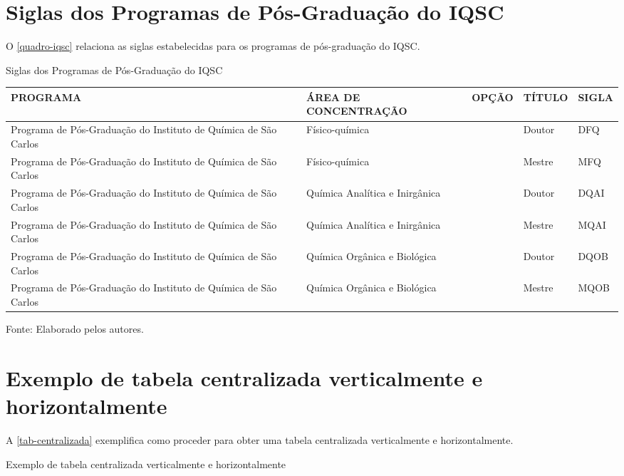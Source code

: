 \begin{apendicesenv}
\chapter{Siglas dos Programas de Pós-Graduação do IQSC}
O \autoref{quadro-iqsc} relaciona as siglas estabelecidas para os programas de pós-graduação do IQSC.
\begin{quadro}[htb]
\ABNTEXfontereduzida
\caption[Siglas dos Programas de Pós-Graduação do IQSC]{Siglas dos Programas de Pós-Graduação do IQSC}
\label{quadro-iqsc}
\begin{tabular}{|p{3.5cm}|p{3.5cm}|p{3.5cm}|p{1.5cm}|p{2.25cm}|}
  \hline
   \textbf{PROGRAMA} & \textbf{ÁREA DE CONCENTRAÇÃO} & \textbf{OPÇÃO} & \textbf{TÍTULO} & \textbf{SIGLA}  \\
    \hline
Programa de Pós-Graduação do Instituto de Química de São Carlos & Físico-química &  & Doutor & DFQ\\
Programa de Pós-Graduação do Instituto de Química de São Carlos & Físico-química &  & Mestre & MFQ\\
Programa de Pós-Graduação do Instituto de Química de São Carlos & Química Analítica e Inirgânica &  & Doutor & DQAI\\
Programa de Pós-Graduação do Instituto de Química de São Carlos & Química Analítica e Inirgânica &  & Mestre & MQAI\\
Programa de Pós-Graduação do Instituto de Química de São Carlos & Química Orgânica e Biológica &  & Doutor & DQOB\\
Programa de Pós-Graduação do Instituto de Química de São Carlos & Química Orgânica e Biológica &  & Mestre & MQOB\\
\hline

\end{tabular}
\begin{flushleft}
		Fonte: Elaborado pelos autores.\
\end{flushleft}
\end{quadro}

\chapter{Exemplo de tabela centralizada verticalmente e horizontalmente}
\index{tabelas}A \autoref{tab-centralizada} exemplifica como proceder para obter uma tabela centralizada verticalmente e horizontalmente.
\begin{table}[htb]
\ABNTEXfontereduzida
\caption[Exemplo de tabela centralizada verticalmente e horizontalmente]{Exemplo de tabela centralizada verticalmente e horizontalmente}
\label{tab-centralizada}


\end{table}
\end{apendicesenv}
